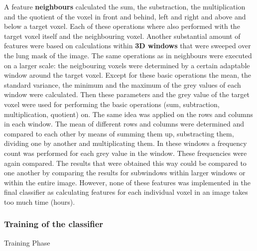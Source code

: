 A feature \textbf{neighbours} calculated the sum, the substraction, the
multiplication and the quotient of the voxel in front and behind, left and right
and above and below a target voxel. Each of these operations where also
performed with the target voxel itself and the neighbouring voxel. Another
substantial amount of features were based on calculations within \textbf{3D
windows} that were sweeped over the lung mask of the image. The same operations
as in neighbours were executed on a larger scale: the neigbouring voxels
were determined by a certain adaptable window around the target voxel. Except
for these basic operations the mean, the standard variance, the minimum and the
maximum of the grey values of each window were calculated. Then these parameters
and the grey value of the target voxel were used for performing the basic
operations (sum, subtraction, multiplication, quotient) on. The same idea was
applied on the rows and columns in each window. The mean of different rows and
columns were determined and compared to each other by means of summing them up,
substracting them, dividing one by another and multiplicating them. In these
windows a frequency count was performed for each grey value in the window. These
frequencies were again compared. The results that were obtained this way could
be compared to one another by comparing the results for subwindows within larger
windows or within the entire image. However, none of these features was
implemented in the final classifier as calculating features for each
individual voxel in an image takes too much time (hours).

\subsubsection{Training of the classifier}
\begin{algorithm}[H]
	\DontPrintSemicolon
	\caption{Training Phase\label{alg:train}}
\end{algorithm}

